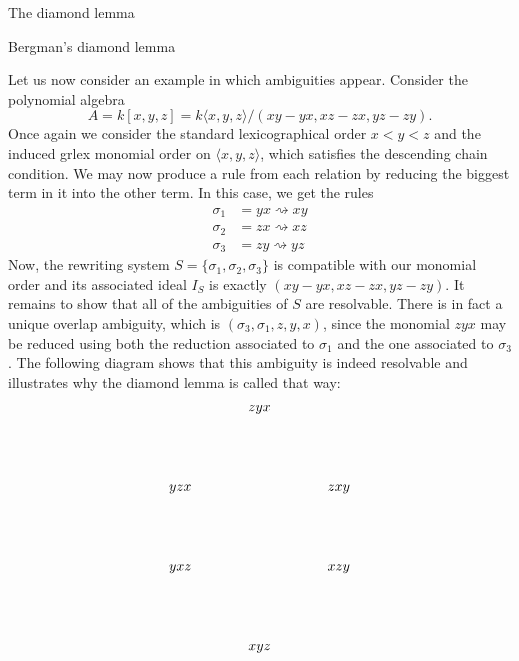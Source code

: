 \begin{chapter}{The diamond lemma}
\begin{section}{Bergman's diamond lemma}
\begin{exmp}
\end{exmp}
\begin{exmp} Let us now consider an example in which ambiguities appear. Consider the polynomial algebra \[A=k[x,y,z]=k\langle x,y,z\rangle/(xy-yx, xz-zx, yz-zy).\]
Once again we consider the standard lexicographical order $x<y<z$ and the induced grlex monomial order on $\langle x,y,z\rangle$, which satisfies the descending chain condition. We may now produce a rule from each relation by reducing the biggest term in it into the other term. In this case, we get the rules
\begin{align*}
\sigma_1 &= yx \rightsquigarrow xy\\
\sigma_2 &= zx \rightsquigarrow xz\\
\sigma_3 &= zy \rightsquigarrow yz
\end{align*}
Now, the rewriting system $S=\{\sigma_1, \sigma_2, \sigma_3\}$ is compatible with our monomial order and its associated ideal $I_S$ is exactly $(xy-yx, xz-zx, yz-zy)$. It remains to show that all of the ambiguities of $S$ are resolvable. There is in fact a unique overlap ambiguity, which is $(\sigma_3, \sigma_1, z, y, x)$, since the monomial $zyx$ may be reduced using both the reduction associated to $\sigma_1$ and the one associated to $\sigma_3$. The following diagram shows that this ambiguity is indeed resolvable and illustrates why the diamond lemma is called that way:
\[
\begin{tikzpicture}
\node (1) at (0,0) {$zyx$};
\node (a1) at (-2,-2) {$yzx$};
\node (a2) at (2,-2) {$zxy$};
\node (b1) at (-2,-4) {$yxz$};
\node (b2) at (2,-4) {$xzy$};
\node (c) at (0,-6) {$xyz$};


\end{tikzpicture}\]
\end{exmp}
\end{section}
\end{chapter}
